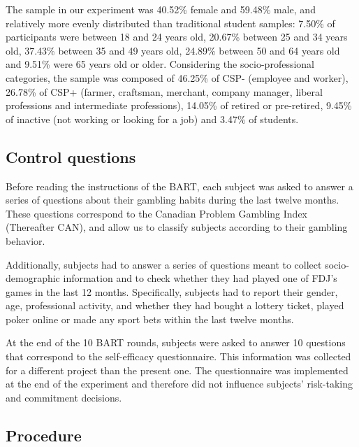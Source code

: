 \documentclass[
]{book}
\begin{document}
The sample in our experiment was 40.52\% female and 59.48\% male, and relatively more evenly distributed than traditional student samples:
7.50\% of participants were between 18 and 24 years old, 20.67\% between 25 and 34 years old, 37.43\% between 35 and 49 years old, 24.89\% between 50 and 64 years old and 9.51\% were 65 years old or older.
Considering the socio-professional categories, the sample was composed of 46.25\% of CSP- (employee and worker), 26.78\% of CSP+ (farmer, craftsman, merchant, company manager, liberal professions and intermediate professions), 14.05\% of retired or pre-retired, 9.45\% of inactive (not working or looking for a job) and 3.47\% of students.

\hypertarget{control-questions}{%
\subsection{Control questions}\label{control-questions}}

Before reading the instructions of the BART, each subject was asked to answer a
series of questions about their gambling habits during the last twelve months.
These questions correspond to the Canadian Problem Gambling Index
(Thereafter CAN), and allow us to classify subjects according to their gambling
behavior.

Additionally, subjects had to answer a series of questions meant to collect
socio-demographic information and to check whether they had played one of FDJ's
games in the last 12 months.
Specifically, subjects had to report their gender, age, professional activity,
and whether they had bought a lottery ticket, played poker online or made any
sport bets within the last twelve months.

At the end of the 10 BART rounds, subjects were asked to answer 10 questions that correspond to the self-efficacy questionnaire.
This information was collected for a different project than the present one.
The questionnaire was implemented at the end of the experiment and therefore did not influence subjects' risk-taking and commitment decisions.

\hypertarget{procedure}{%
\subsection{Procedure}\label{procedure}}
\end{document}
